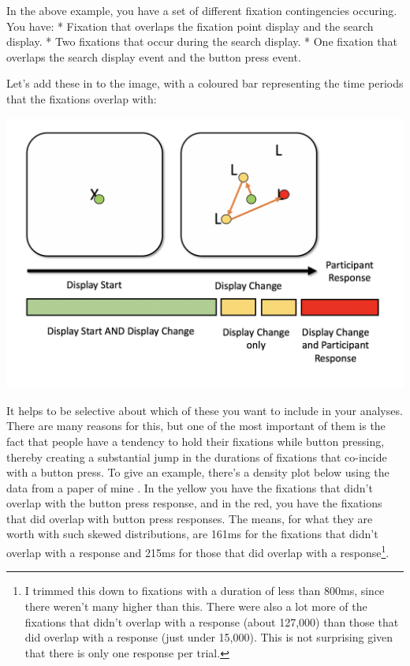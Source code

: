 \documentclass[]{book}
\let\rmarkdownfootnote\footnote%
\def\footnote{\protect\rmarkdownfootnote}
\begin{document}
In the above example, you have a set of different fixation contingencies occuring. You have:
* Fixation that overlaps the fixation point display and the search display.
* Two fixations that occur during the search display.
* One fixation that overlaps the search display event and the button press event.

Let's add these in to the image, with a coloured bar representing the time periods that the fixations overlap with:

\includegraphics[width=18.25in]{files/images/baseTrialFixesGantt}

It helps to be selective about which of these you want to include in your analyses. There are many reasons for this, but one of the most important of them is the fact that people have a tendency to hold their fixations while button pressing, thereby creating a substantial jump in the durations of fixations that co-incide with a button press. To give an example, there's a density plot below using the data from a paper of mine \citep{Godwin2015}. In the yellow you have the fixations that didn't overlap with the button press response, and in the red, you have the fixations that did overlap with button press responses. The means, for what they are worth with such skewed distributions, are 161ms for the fixations that didn't overlap with a response and 215ms for those that did overlap with a response\footnote{I trimmed this down to fixations with a duration of less than 800ms, since there weren't many higher than this. There were also a lot more of the fixations that didn't overlap with a response (about 127,000) than those that did overlap with a response (just under 15,000). This is not surprising given that there is only one response per trial.}.
\end{document}
